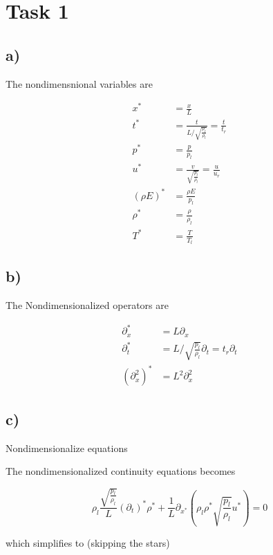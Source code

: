 \documentclass{article}
\newcommand{\vref}{ \sqrt{\frac{p_l}{\rho_l}} }
\begin{document}

\section{Task 1}

\subsection{a)}
The nondimensnional variables are

\begin{align}
	x^* &= \frac{x}{L} \\
	t^* &= \frac{t}{L/\sqrt{\frac{p_l}{\rho_l}}} = \frac{t}{t_r} \\
	p^* &= \frac{p}{p_l} \\
	u^* &= \frac{v}{\sqrt{\frac{p_l}{\rho_l}}} = \frac{u}{u_r} \\
	(\rho E)^* &= \frac{\rho E}{p_l} \\
	\rho^* &= \frac{\rho}{\rho_l} \\
	T^* &= \frac{T}{T_l}
\end{align}

\subsection{b)}
The Nondimensionalized operators are

\begin{align}
	\partial_x^* &= L\partial_x \\
	\partial_t^* &= L/\sqrt{\frac{p_l}{\rho_l}} \partial_t = t_r \partial_t\\
	(\partial_x^2)^* &= L^2 \partial_x^2
\end{align}

\subsection{c)}
Nondimensionalize equations

The nondimensionalized continuity equations becomes

\begin{equation}
 	\rho_l \frac{\vref}{ L} (\partial_t)^* \rho^* + \frac{1}{L} \partial_{x^*} (\rho_l\rho^* \vref u^*) = 0
\end{equation}

which simplifies to (skipping the stars)
\end{document}
